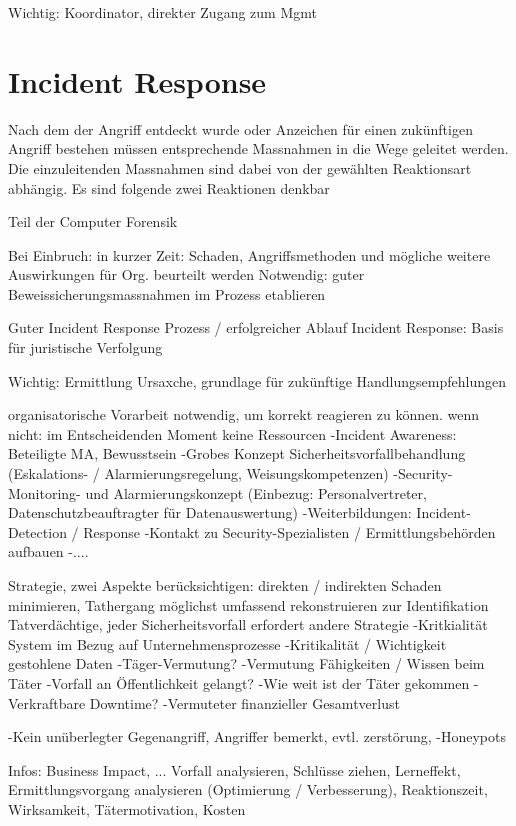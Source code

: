 Wichtig: Koordinator, direkter Zugang zum Mgmt


\section{Incident Response}
Nach dem der Angriff entdeckt wurde oder Anzeichen für einen zukünftigen Angriff bestehen müssen entsprechende Massnahmen in die Wege geleitet werden. Die einzuleitenden Massnahmen sind dabei von der gewählten Reaktionsart abhängig. Es sind folgende zwei Reaktionen denkbar

Teil der Computer Forensik

Bei Einbruch: in kurzer Zeit: Schaden, Angriffsmethoden und mögliche weitere Auswirkungen für Org. beurteilt werden
Notwendig: guter Beweissicherungsmassnahmen im Prozess etablieren

Guter Incident Response Prozess / erfolgreicher Ablauf Incident Response: Basis für juristische Verfolgung

Wichtig: Ermittlung Ursaxche, grundlage für zukünftige Handlungsempfehlungen

organisatorische Vorarbeit notwendig, um korrekt reagieren zu können. wenn nicht: im Entscheidenden Moment keine Ressourcen
-Incident Awareness: Beteiligte MA, Bewusstsein
-Grobes Konzept Sicherheitsvorfallbehandlung (Eskalations- / Alarmierungsregelung, Weisungskompetenzen)
-Security-Monitoring- und Alarmierungskonzept (Einbezug: Personalvertreter, Datenschutzbeauftragter für Datenauswertung)
-Weiterbildungen: Incident-Detection / Response
-Kontakt zu Security-Spezialisten / Ermittlungsbehörden aufbauen
-....

Strategie, zwei Aspekte berücksichtigen: direkten / indirekten Schaden minimieren, Tathergang möglichst umfassend rekonstruieren zur Identifikation Tatverdächtige, jeder Sicherheitsvorfall erfordert andere Strategie
-Kritkialität System im Bezug auf Unternehmensprozesse
-Kritikalität / Wichtigkeit gestohlene Daten
-Täger-Vermutung?
-Vermutung Fähigkeiten / Wissen beim Täter
-Vorfall an Öffentlichkeit gelangt?
-Wie weit ist der Täter gekommen
-Verkraftbare Downtime?
-Vermuteter finanzieller Gesamtverlust

-Kein unüberlegter Gegenangriff, Angriffer bemerkt, evtl. zerstörung,
-Honeypots

Infos: Business Impact, ...
Vorfall analysieren, Schlüsse ziehen, Lerneffekt, Ermittlungsvorgang analysieren (Optimierung / Verbesserung), Reaktionszeit, Wirksamkeit, Tätermotivation, Kosten

